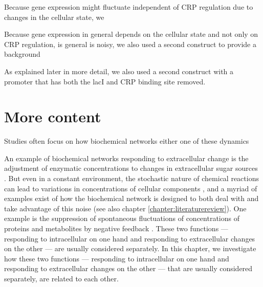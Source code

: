 

% 
Because gene expression might fluctuate independent of CRP regulation due to changes in the cellular state,
we 

Because gene expression in general depends on the cellular state and not only on CRP regulation, 
is general is noisy, we also used a second construct to provide a background 


%
As explained later in more detail, we also used a second construct with a promoter that has both the lacI and CRP binding site removed. 
%

























\section{More content}




Studies often focus on how biochemical networks either one of these dynamics

An example of biochemical networks responding to extracellular change is the adjustment of enzymatic concentrations to changes in extracellular sugar sources \cite{Towbin2017}.
But even in a constant environment, the stochastic nature of chemical reactions can lead to variations in concentrations of cellular components  \cite{Elowitz2002,Kiviet2014}, 
and a myriad of examples exist of how the biochemical network is designed to both deal with and take advantage of this noise (see also chapter \ref{chapter:literaturereview}).
One example is the suppression of spontaneous fluctuations of concentrations of proteins and metabolites by negative feedback \cite{Brandman2008, Lestas2010, Bowsher2013}.
These two functions --- responding to intracellular on one hand and responding to extracellular changes on the other --- are usually considered separately.
In this chapter, we investigate how these two functions --- responding to intracellular on one hand and responding to extracellular changes on the other --- that are usually considered separately, are related to each other.



